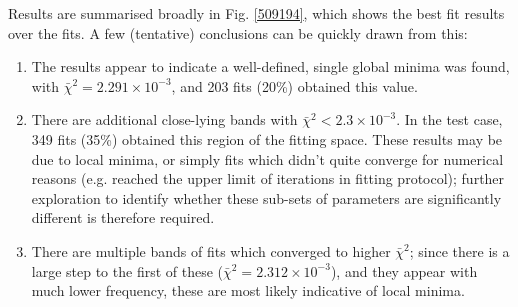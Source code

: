 \documentclass[10pt]{article}
\begin{document}
Results are summarised broadly in Fig. \ref{509194}, which shows the best fit results over the fits. A few (tentative) conclusions can be quickly drawn from this:

\begin{enumerate}
\item The results appear to indicate a well-defined, single global minima was found, with $\bar{\chi}^2 = 2.291\times10^{-3}$, and 203 fits (20\%) obtained this value.
\item There are additional close-lying bands with $\bar{\chi}^2 < 2.3\times10^{-3}$. In the test case, 349 fits (35\%) obtained this region of the fitting space. These results may be due to local minima, or simply fits which didn't quite converge for numerical reasons (e.g. reached the upper limit of iterations in fitting protocol); further exploration to identify whether these sub-sets of parameters are significantly different is therefore required.
\item There are multiple bands of fits which converged to higher $\bar{\chi}^2$; since there is a large step to the first of these ($\bar{\chi}^2 = 2.312\times10^{-3}$), and they appear with much lower frequency, these are most likely indicative of local minima.

\end{enumerate}
\end{document}
